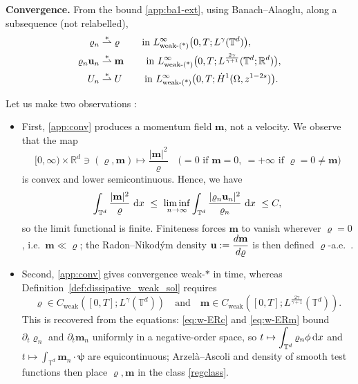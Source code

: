 \documentclass[12pt,a4paper,twoside]{article}
\newcommand{\vr}{\varrho}
\newcommand{\vu}{\vc{u}}
\newcommand{\vc}[1]{{\bf #1}}
\newcommand{\dx}{{\,\rm d} {x}}
\numberwithin{equation}{section}%
\newcommand{\T}{\mathbb{T}}
\begin{document}
\textbf{{Convergence.} } From the bound \eqref{app:ba1-ext}, using  Banach--Alaoglu, along a subsequence (not relabelled),
\begin{align}\label{app:conv}
	\begin{split}
			\vr_n &\overset{*}{\rightharpoonup} \vr \qquad \text{ in } L^\infty_{\text{weak-(*)}}\big(0,T;L^\gamma(\mathbb{T}^d)\big), \\
		\vr_n\vu_n &\overset{*}{\rightharpoonup} \mathbf{m} \qquad \text{ in } L^\infty_{\text{weak-(*)}}\big(0,T;L^{\frac{2\gamma}{\gamma+1}}(\mathbb{T}^d;\mathbb{R}^d)\big), \\
		U_n &\overset{*}{\rightharpoonup} U \qquad \text{ in } L^\infty_{\text{weak-(*)}}\big(0,T;\dot H^1(\Omega, z^{1-2s})\big). 
	\end{split}
\end{align}

Let us make two observations :

\begin{itemize}[leftmargin=*]
	\item First, \eqref{app:conv} produces a momentum field $\mathbf m$, not a velocity. We observe that the map
	\[
	[0,\infty)\times\mathbb R^d\ni(\vr,\mathbf m)\longmapsto \frac{|\mathbf m|^2}{\vr}
	\quad\Big(=0 \text{ if }\mathbf m=0,\ =+\infty \text{ if }\vr=0\neq\mathbf m\Big)
	\]
	is convex and lower semicontinuous. Hence, we have
	\[
	\int_{\mathbb T^d}\frac{|\mathbf m|^2}{\vr}\,\dx \ \le\ \liminf_{n\to\infty}\int_{\mathbb T^d}\frac{|\vr_n\vu_n|^2}{\vr_n}\,\dx \ \leq C,
	\]
	so the limit functional is finite. Finiteness forces $\mathbf m$ to vanish wherever $\vr=0$, i.e.\ $\mathbf m\ll\vr$; the Radon--Nikod\'ym density $\vu:=\dfrac{d\mathbf m}{d\vr}$ is then defined $\vr$-a.e.\ . 
	
	\item Second, \eqref{app:conv} gives convergence weak-$*$ in time, whereas
	Definition~\ref{def:dissipative_weak_sol} requires
	\[
	\vr\in C_{\mathrm{weak}}([0,T];L^\gamma(\T^d))
	\quad\text{and}\quad
	\mathbf m\in C_{\mathrm{weak}}([0,T];L^{\frac{2\gamma}{\gamma+1}}(\T^d)).
	\]
	This is recovered from the equations: \eqref{eq:w-ERc} and \eqref{eq:w-ERm} bound $\partial_t\vr_n$ and $\partial_t\mathbf m_n$ uniformly in a negative-order space, so $\displaystyle t\mapsto\int_{\T^d}\vr_n\phi \dx $ and $t\mapsto\int_{\T^d}\mathbf m_n\cdot\pmb\psi$ are equicontinuous; Arzel\`a--Ascoli and density of smooth test functions then place $\vr,\mathbf m$ in the class \eqref{regclass}.
\end{itemize}
\end{document}
